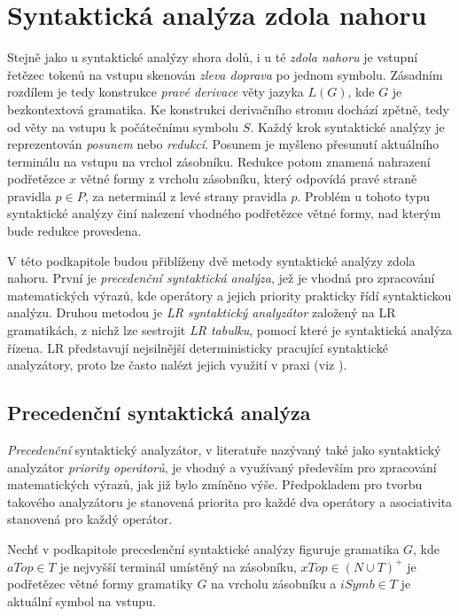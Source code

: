 \section{Syntaktická analýza zdola nahoru} \label{nadpisSAZdolaNahoru}
Stejně jako u syntaktické analýzy shora dolů, i u té \emph{zdola nahoru} je vstupní řetězec tokenů na vstupu skenován \emph{zleva doprava} po jednom symbolu.
Zásadním rozdílem je tedy konstrukce \emph{pravé derivace} věty jazyka $L(G)$, kde $G$ je bezkontextová gramatika. Ke konstrukci derivačního stromu dochází zpětně,
tedy od věty na vstupu k počátečnímu symbolu $S$. Každý krok syntaktické analýzy je reprezentován \emph{posunem} nebo \emph{redukcí}. Posunem je myšleno přesunutí
aktuálního terminálu na vstupu na vrchol zásobníku. Redukce potom znamená nahrazení podřetězce $x$ větné formy z vrcholu zásobníku, který odpovídá pravé straně
pravidla $p \in P$, za neterminál z levé strany pravidla $p$. Problém u tohoto typu syntaktické analýzy činí nalezení vhodného podřetězce větné formy, nad kterým
bude redukce provedena.

V této podkapitole budou přiblíženy dvě metody syntaktické analýzy zdola nahoru. První je \emph{precedenční syntaktická analýza}, jež je vhodná pro zpracování matematických
výrazů, kde operátory a jejich priority prakticky řídí syntaktickou analýzu. Druhou metodou je \emph{LR syntaktický analyzátor} založený na LR gramatikách, z nichž lze
sestrojit \emph{LR tabulku}, pomocí které je syntaktická analýza řízena. LR představují nejsilnější deterministicky pracující syntaktické analyzátory, proto lze často
nalézt jejich využití v praxi (viz \cite{Meduna:2008:ElementsOfCompilerDesign}).

\subsection*{Precedenční syntaktická analýza}
\emph{Precedenční} syntaktický analyzátor, v literatuře nazývaný také jako syntaktický analyzátor \emph{priority operátorů}, je vhodný a využívaný především pro zpracování
matematických výrazů, jak již bylo zmíněno výše. Předpokladem pro tvorbu takového analyzátoru je stanovená priorita pro každé dva operátory a asociativita stanovená pro každý operátor.

\begin{konvence}
  Nechť v podkapitole precedenční syntaktické analýzy figuruje gramatika $G$, kde $aTop \in T$ je nejvyšší terminál umístěný na zásobníku, $xTop \in (N \cup T)^+$ je podřetězec větné formy gramatiky $G$
  na vrcholu zásobníku a $iSymb \in T$ je aktuální symbol na vstupu.
\end{konvence}

